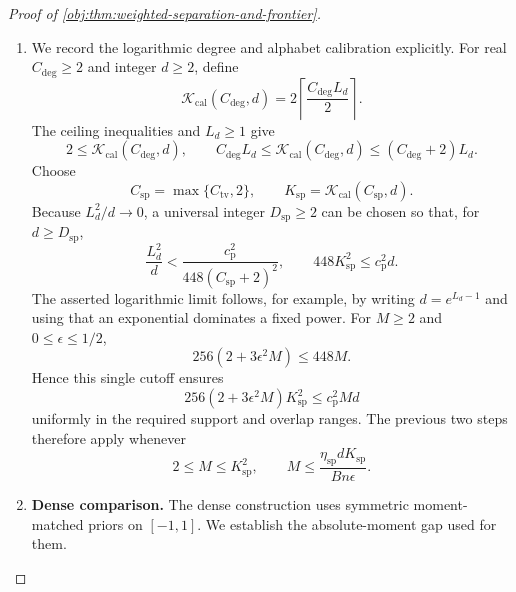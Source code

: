 \begin{proof}[Proof of \cref{obj:thm:weighted-separation-and-frontier}]
\begin{enumerate}
\item
We record the logarithmic degree and alphabet calibration explicitly. For real \(C_{\mathrm{deg}}\ge2\) and integer \(d\ge2\), define
\[
\mathcal K_{\mathrm{cal}}(C_{\mathrm{deg}},d)
=2\left\lceil\frac{C_{\mathrm{deg}}L_d}{2}\right\rceil.
\]
The ceiling inequalities and \(L_d\ge1\) give
\[
2\le\mathcal K_{\mathrm{cal}}(C_{\mathrm{deg}},d),
\qquad
C_{\mathrm{deg}}L_d
\le\mathcal K_{\mathrm{cal}}(C_{\mathrm{deg}},d)
\le(C_{\mathrm{deg}}+2)L_d.
\]
Choose
\[
C_{\mathrm{sp}}=\max\{C_{\mathrm{tv}},2\},
\qquad
K_{\mathrm{sp}}=\mathcal K_{\mathrm{cal}}(C_{\mathrm{sp}},d).
\]
Because \(L_d^2/d\to0\), a universal integer \(D_{\mathrm{sp}}\ge2\) can be chosen so that, for \(d\ge D_{\mathrm{sp}}\),
\[
\frac{L_d^2}{d}
<
\frac{c_{\mathrm p}^2}{448(C_{\mathrm{sp}}+2)^2},
\qquad
448K_{\mathrm{sp}}^2\le c_{\mathrm p}^2d.
\]
The asserted logarithmic limit follows, for example, by writing
\(d=e^{L_d-1}\) and using that an exponential dominates a fixed power. For \(M\ge2\) and \(0\le\epsilon\le1/2\),
\[
256(2+3\epsilon^2M)\le448M.
\]
Hence this single cutoff ensures
\[
256(2+3\epsilon^2M)K_{\mathrm{sp}}^2
\le c_{\mathrm p}^2Md
\]
uniformly in the required support and overlap ranges. The previous two steps therefore apply whenever
\[
2\le M\le K_{\mathrm{sp}}^2,
\qquad
M\le\frac{\eta_{\mathrm{sp}}dK_{\mathrm{sp}}}{Bn\epsilon}.
\]

\item
\textbf{Dense comparison.}\quad
The dense construction uses symmetric moment-matched priors on \([-1,1]\). We establish the absolute-moment gap used for them.


\end{enumerate}
\end{proof}
